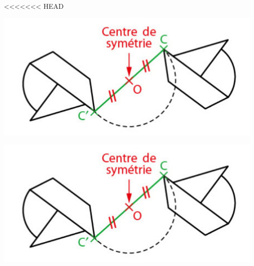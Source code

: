 \documentclass[12pt,a4paper]{article}
\date{}
\title{}
\begin{document}





<<<<<<< HEAD
%	
%	
%
%


%
%
%
%


\begin{center}
	\includegraphics[scale=.75]{fig2}
\end{center}

\begin{center}
	\includegraphics[scale=.75]{fig2}
\end{center}
\end{document}
